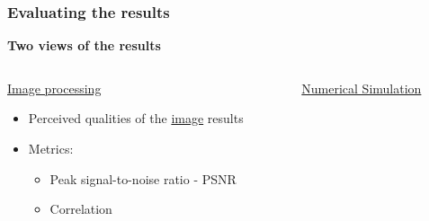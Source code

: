 \documentclass[18pt]{beamer}
\begin{document}
\begin{frame}[t]
  \frametitle{Evaluating the results}
  \begin{center}
    \textbf{\Large Two views of the results}
  \end{center}
  \vspace{-1cm}
  \begin{columns}[t]
    \begin{column}{0.5\textwidth}
      \begin{center}
        {\large \underline{Image processing}}
        \begin{itemize}
        \item Perceived qualities of the \underline{image} results
        \item Metrics:
          \begin{itemize}
          \item Peak signal-to-noise ratio - PSNR
          \item Correlation
          \end{itemize}
        \end{itemize}
      \end{center}
    \end{column}
    \begin{column}{0.5\textwidth}
      \begin{center}
        {\large \underline{Numerical Simulation}}
      \end{center}  
    \end{column}
  \end{columns}
\end{frame}
\end{document}
